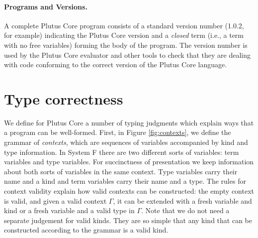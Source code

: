 \documentclass[a4paper]{article}
\begin{document}
\paragraph{Programs and Versions.} A complete Plutus Core program
consists of a standard version number (1.0.2, for example) indicating
the Plutus Core version and a \textit{closed} term (i.e., a term with no
free variables) forming the body of the program.  The version number
is used by the Plutus Core evaluator and other tools to check that
they are dealing with code conforming to the correct version of the
Plutus Core language.

\section{Type correctness}

We define for Plutus Core a number of typing judgments which explain
ways that a program can be well-formed. First, in Figure
\ref{fig:contexts}, we define the grammar of \textit{contexts},
which are sequences of variables accompanied by kind and type
information. In System F there are two different sorts of variables:
term variables and type variables. For succinctness of presentation we
keep information about both sorts of variables in the same
context. Type variables carry their name and a kind and term variables
carry their name and a type. The rules for context validity explain
how valid contexts can be constructed: the empty context is valid, and
given a valid context $\Gamma$, it can be extended with a fresh
variable and kind or a fresh variable and a valid type in
$\Gamma$. Note that we do not need a separate judgement for valid
kinds. They are so simple that any kind that can be constructed
according to the grammar is a valid kind.

\end{document}
